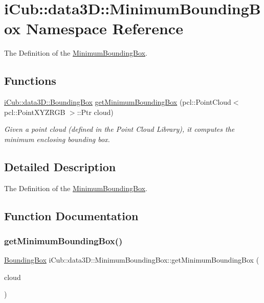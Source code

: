 \section{i\+Cub\+:\+:data3D\+:\+:Minimum\+Bounding\+Box Namespace Reference}
\label{namespaceiCub_1_1data3D_1_1MinimumBoundingBox}


The Definition of the \hyperlink{namespaceiCub_1_1data3D_1_1MinimumBoundingBox}{Minimum\+Bounding\+Box}.  


\subsection*{Functions}
\begin{DoxyCompactItemize}
\item 
\hyperlink{classiCub_1_1data3D_1_1BoundingBox}{i\+Cub\+::data3\+D\+::\+Bounding\+Box} \hyperlink{namespaceiCub_1_1data3D_1_1MinimumBoundingBox_a4ca6345989a239a51977bf93d7ce085c}{get\+Minimum\+Bounding\+Box} (pcl\+::\+Point\+Cloud$<$ pcl\+::\+Point\+X\+Y\+Z\+R\+GB $>$\+::Ptr cloud)
\begin{DoxyCompactList}\small\item\em Given a point cloud (defined in the Point Cloud Library), it computes the minimum enclosing bounding box. \end{DoxyCompactList}\end{DoxyCompactItemize}


\subsection{Detailed Description}
The Definition of the \hyperlink{namespaceiCub_1_1data3D_1_1MinimumBoundingBox}{Minimum\+Bounding\+Box}. 

\subsection{Function Documentation}
\label{namespaceiCub_1_1data3D_1_1MinimumBoundingBox_a4ca6345989a239a51977bf93d7ce085c} 
\subsubsection{\texorpdfstring{get\+Minimum\+Bounding\+Box()}{getMinimumBoundingBox()}}
{\footnotesize\ttfamily \hyperlink{classiCub_1_1data3D_1_1BoundingBox}{Bounding\+Box} i\+Cub\+::data3\+D\+::\+Minimum\+Bounding\+Box\+::get\+Minimum\+Bounding\+Box (\begin{DoxyParamCaption}\item[{pcl\+::\+Point\+Cloud$<$ pcl\+::\+Point\+X\+Y\+Z\+R\+GB $>$\+::Ptr}]{cloud }\end{DoxyParamCaption})}



